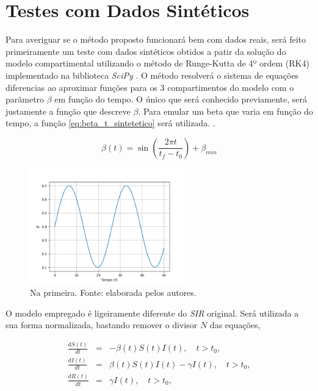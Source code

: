 \section{Testes com Dados Sintéticos}

Para averiguar se o método proposto funcionará bem com dados reais,
será feito primeiramente um teste com dados sintéticos obtidos a patir da solução
do modelo compartimental utilizando o método de Runge-Kutta de 4º ordem (RK4)
implementado na biblioteca \textit{SciPy} \cite{scipy}. O método resolverá 
o sistema de equações diferencias ao aproximar funções para os 3 compartimentos
do modelo  com o parãmetro $\beta$ em função do tempo. O único que 
será conhecido previamente, será justamente a função que descreve $\beta$.
Para emular um beta que varia em função do tempo, 
a função \ref{eq:beta_t_sintetetico} será utilizada.
\cite{andreu-vilarroig-etal:2025-sugestao-beta-t}
\cite{edlnd-etal:2011-sugestao-beta-t}.

\begin{equation} \label{eq:beta_t_sintetetico}
    \beta(t) = \sin(\frac{2\pi t}{t_f - t_0})  + \beta_{min}
\end{equation}

\begin{figure}[htpb]
\centering
\includegraphics[width=0.6\textwidth]{figuras/real-beta-sir-nonoise.png}
\caption{Na primeira. Fonte: elaborada pelos autores.}
\label{fig:beta-sir-semruido}
\end{figure}

O modelo empregado é ligeiramente diferente do \textit{SIR} original. 
Será utilizada a sua forma normalizada, bastando remover o divisor $N$
das equações,

\begin{eqnarray}
   \frac{dS(t)}{dt} &=& -\beta(t) S(t) I(t),  \quad t > t_0, \label{eq:SIR-beta-t-1-norm}\\
   \frac{dI(t)}{dt} &=& \beta(t) S(t) I(t) - \gamma I(t), \quad t > t_0, \label{eq:SIR-beta-t-2-norm}\\
   \frac{dR(t)}{dt} &=& \gamma I(t),  \quad t > t_0, \label{eq:SIR-beta-t-3-norm}
\end{eqnarray}

